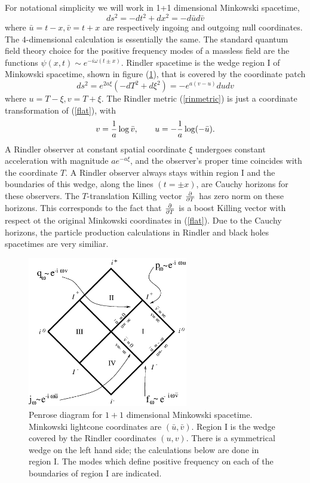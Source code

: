 \documentclass[12pt]{article}
\newcommand{\be}{\begin{equation}}
\newcommand{\ee}{\end{equation}}
\def\ub{\bar u}
\def\vb{\bar v}
\begin{document}
For notational simplicity we will work in 1+1 dimensional Minkowski
spacetime,
%
\be\label{flat}ds^2 = - dt^2 +dx^2 = -d\ub  d\vb \ee
%
where $\ub =t-x ,\vb =t+x$ are respectively ingoing and outgoing null
coordinates.
The $4$-dimensional calculation is essentially the same.
The standard quantum field theory choice for the positive
frequency modes of a massless field are the functions $\psi (x,t)\sim
e^{-i\omega (t\pm x)}$.
Rindler spacetime is the wedge region I of Minkowski spacetime, shown in
figure (\ref{f1}), that is covered
by the coordinate patch
%
\be\label{rinmetric}ds^2 =e^{2a\xi }(-dT^2 +d\xi ^2) =-e^{a(v-u)} dudv\ee
%
where $u=T-\xi , v=T+\xi$.  The Rindler metric (\ref{rinmetric}) is just a
coordinate
transformation of (\ref{flat}), with
%
\be\label{rincoord}v= {1\over a}\log\vb, \qquad  u=-{1\over a}\log (-\ub).\ee
%
A Rindler observer at constant spatial coordinate $\xi$ undergoes
constant acceleration with magnitude $ae^{ -a\xi }$, and the observer's proper
time coincides with the coordinate $T$.
A Rindler observer always stays within region I and
the boundaries of this wedge, along the lines $(t=\pm x)$, are
Cauchy horizons for these observers.
The $T$-translation Killing vector
${\partial\over\partial T}$
has zero norm on these horizons.  This corresponds to the fact that
${\partial\over\partial T}$ is a boost
Killing vector with respect ot the original Minkowski coordinates in
(\ref{flat}). Due to the
Cauchy horizons, the particle production calculations in Rindler and black
holes spacetimes
are very similiar.

\begin{figure}[tb]
\begin{center}
\includegraphics[width=2.75in]{minkowski.eps}
\end{center}
\caption{Penrose diagram for $1+1$ dimensional Minkowski spacetime.
Minkowski lightcone coordinates are $(\bar u,\bar v)$.
Region I is the wedge covered by the
Rindler coordinates $(u,v)$. There is a symmetrical wedge on the left hand
side; the
calculations below are done in region I. The modes which define positive
frequency on each of
the boundaries of region I are indicated.}
\label{f1}
\end{figure}
\end{document}
